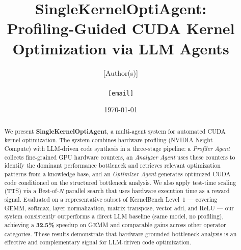 \documentclass[10pt,twocolumn]{article}
\title{%
  \textbf{SingleKernelOptiAgent}:\\
  Profiling-Guided CUDA Kernel Optimization via LLM Agents
}
\author{%
  [Author(s)]\\
  [Institution]\\
  \texttt{[email]}
}
\date{\today}
\begin{document}
\maketitle

\begin{abstract}
We present \textbf{SingleKernelOptiAgent}, a multi-agent system for automated
CUDA kernel optimization.
The system combines hardware profiling (NVIDIA Nsight Compute) with LLM-driven
code synthesis in a three-stage pipeline: a \textit{Profiler Agent} collects
fine-grained GPU hardware counters, an \textit{Analyzer Agent} uses these
counters to identify the dominant performance bottleneck and retrieves relevant
optimization patterns from a knowledge base, and an \textit{Optimizer Agent}
generates optimized CUDA code conditioned on the structured bottleneck analysis.
We also apply test-time scaling (TTS) via a Best-of-$N$ parallel search that
uses hardware execution time as a reward signal.
Evaluated on a representative subset of KernelBench Level~1 — covering GEMM,
softmax, layer normalization, matrix transpose, vector add, and ReLU —
our system consistently outperforms a direct LLM baseline (same model, no
profiling), achieving a \textbf{32.5\%} speedup on GEMM and comparable gains
across other operator categories.
These results demonstrate that hardware-grounded bottleneck analysis is an
effective and complementary signal for LLM-driven code optimization.
\end{abstract}








\end{document}
